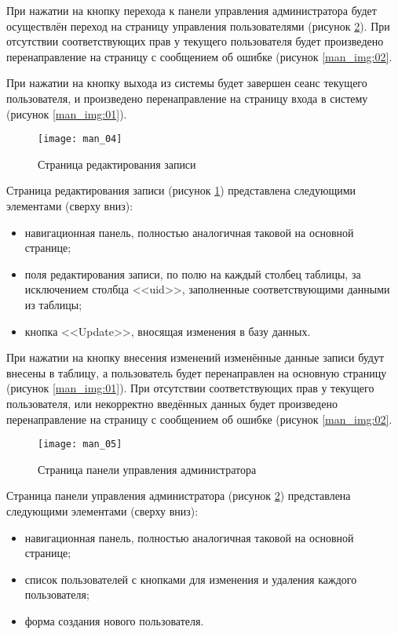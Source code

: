При нажатии на кнопку перехода к панели управления администратора будет осуществлён переход на страницу управления пользователями (рисунок \ref{man_img:05}). При отсутствии соответствующих прав у текущего пользователя будет произведено перенаправление на страницу с сообщением об ошибке (рисунок \ref{man_img:02}.\par

При нажатии на кнопку выхода из системы будет завершен сеанс текущего пользователя, и произведено перенаправление на страницу входа в систему (рисунок \ref{man_img:01}).\par

\begin{figure}[h!]
    \centering
    \texttt{[image: man\_04]}
    \caption{Страница редактирования записи}
    \label{man_img:04}
\end{figure}

Страница редактирования записи (рисунок \ref{man_img:04}) представлена следующими элементами (сверху вниз):
\begin{itemize}
    \item навигационная панель, полностью аналогичная таковой на основной странице;
    \item поля редактирования записи, по полю на каждый столбец таблицы, за исключением столбца <<uid>>, заполненные соответствующими данными из таблицы;
    \item кнопка <<Update>>, вносящая изменения в базу данных.
\end{itemize}

При нажатии на кнопку внесения изменений изменённые данные записи будут внесены в таблицу, а пользователь будет перенаправлен на основную страницу (рисунок \ref{man_img:01}). При отсутствии соответствующих прав у текущего пользователя, или некорректно введённых данных будет произведено перенаправление на страницу с сообщением об ошибке (рисунок \ref{man_img:02}.\par

\begin{figure}[h!]
    \centering
    \texttt{[image: man\_05]}
    \caption{Страница панели управления администратора}
    \label{man_img:05}
\end{figure}

Страница панели управления администратора (рисунок \ref{man_img:05}) представлена следующими элементами (сверху вниз):
\begin{itemize}
    \item навигационная панель, полностью аналогичная таковой на основной странице;
    \item список пользователей с кнопками для изменения и удаления каждого пользователя;
    \item форма создания нового пользователя.
\end{itemize}

